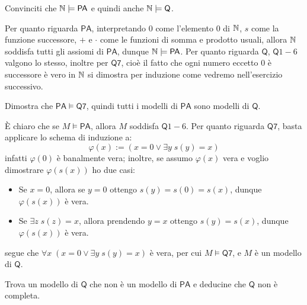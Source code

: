 \begin{exercise}
    Convinciti che $\mathbb N \models \mathsf{PA}$ e quindi anche $\mathbb N \models \mathsf{Q}$.
\end{exercise}

\begin{soln}
    Per quanto riguarda $\mathsf{PA}$, interpretando 0 come l'elemento 0 di $\mathbb N$, $s$ come la funzione successore, $+$ e $\cdot$ come le funzioni di somma e prodotto usuali, allora
    $\mathbb N$ soddisfa tutti gli assiomi di $\mathsf{PA}$, dunque $\mathbb N \models \mathsf{PA}$. Per quanto riguarda $\mathsf{Q}$, $\mathsf{Q}1-6$ valgono lo stesso, inoltre per $\mathsf{Q7}$, cioè il fatto che
    ogni numero eccetto 0 è successore è vero in $\mathbb N$ si dimostra per induzione come vedremo nell'esercizio successivo.
\end{soln}

\begin{exercise}
    Dimostra che $\mathsf{PA} \models \mathsf{Q7}$, quindi tutti i modelli di $\mathsf{PA}$ sono modelli di $\mathsf{Q}$.
\end{exercise}

\begin{soln}
    È chiaro che se $M \models \mathsf{PA}$, allora $M$ soddisfa $\mathsf{Q}1-6$. Per quanto riguarda $\mathsf{Q7}$, basta applicare lo schema di induzione a:
    \[ \varphi(x) := (x = 0 \lor \exists y \; s(y) = x) \]
    infatti $\varphi(0)$ è banalmente vera; inoltre, se assumo $\varphi(x)$ vera e voglio dimostrare $\varphi(s(x))$ ho due casi:
    \begin{itemize}
        \item Se $x = 0$, allora se $y = 0$ ottengo $s(y) = s(0) = s(x)$, dunque $\varphi(s(x))$ è vera.
        \item Se $\exists z \; s(z) = x$, allora prendendo $y = x$ ottengo $s(y) = s(x)$, dunque $\varphi(s(x))$ è vera.
    \end{itemize}
    segue che $\forall x \; (x = 0 \lor \exists y \; s(y) = x)$ è vera, per cui $M \models \mathsf{Q7}$, e $M$ è un modello di $\mathsf{Q}$.
\end{soln}

\begin{exercise}
    Trova un modello di $\mathsf{Q}$ che non è un modello di $\mathsf{PA}$ e deducine che $\mathsf{Q}$ non è completa.
\end{exercise}


